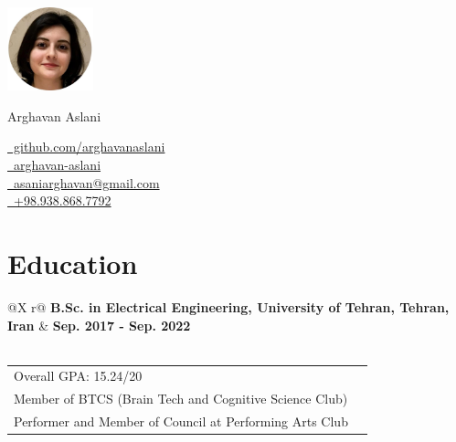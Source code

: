 \documentclass[a4paper,12pt]{article}
\begin{document}
\pagestyle{empty} 


\begin{minipage}[c]{2.5cm}
    \includegraphics[width=2.5cm]{./avatar/avatar4.jpg}
\end{minipage}%
\hspace{1em}
\begin{minipage}[c]{\dimexpr\linewidth-2.5cm-15em\relax}
    \Huge{Arghavan Aslani}
\end{minipage}%
\begin{minipage}[c]{0.3\linewidth}
    \href{https://github.com/arghavanaslani}{\raisebox{-0.05\height}\faGithub\ github.com/arghavanaslani} \\ 
    \href{https://www.linkedin.com/in/arghavan-aslani/}{\raisebox{-0.05\height}\faLinkedin\ arghavan-aslani} \\ 
    \href{mailto:aslaniarghavan@gmail.com}{\raisebox{-0.05\height}\faEnvelope \ asaniarghavan@gmail.com} \\ 
    \href{tel:+989388687792}{\raisebox{-0.05\height}\faMobile \ +98.938.868.7792}
\end{minipage}

\section{Education}
\begin{tabularx}{\linewidth}{@{}X r@{}}
    \textbf{B.Sc. in Electrical Engineering, University of Tehran, Tehran, Iran} & \textbf{Sep. 2017 - Sep. 2022} \\
     \\
\end{tabularx}

\begin{tabularx}{\linewidth}{@{}X r@{}}
    {Overall GPA: 15.24/20} & \hfill \href{}{} \\[3.75pt]
    {Member of BTCS (Brain Tech and Cognitive Science Club)} & \hfill \href{}{} \\[3.75pt]
    {Performer and Member of Council at Performing Arts Club} & \hfill \href{}{} \\[3.75pt]
\end{tabularx}
\end{document}
